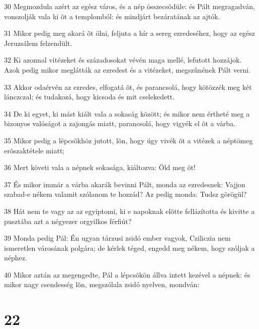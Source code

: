\par 30 Megmozdula azért az egész város, és a nép összecsõdüle: és Pált megragadván, vonszolják vala ki õt a templomból: és mindjárt bezáratának az ajtók.
\par 31 Mikor pedig meg akará õt ölni, feljuta a hír a sereg ezredeséhez, hogy az egész Jeruzsálem felzendült.
\par 32 Ki azonnal vitézeket és századosokat vévén maga mellé, lefutott hozzájok. Azok pedig mikor meglátták az ezredest és a vitézeket, megszûnének Pált verni.
\par 33 Akkor odaérvén az ezredes, elfogatá õt, és parancsolá, hogy kötözzék meg két lánczczal; és tudakozá, hogy kicsoda és mit cselekedett.
\par 34 De ki egyet, ki mást kiált vala a sokaság között; és mikor nem értheté meg a bizonyos valóságot a zajongás miatt, parancsolá, hogy vigyék el õt a várba.
\par 35 Mikor pedig a lépcsõkhöz jutott, lõn, hogy úgy vivék õt a vitézek a néptömeg erõszaktétele miatt;
\par 36 Mert követi vala a népnek sokasága, kiáltozva: Öld meg õt!
\par 37 És mikor immár a várba akarák bevinni Pált, monda az ezredesnek: Vajjon szabad-e nékem valamit szólanom te hozzád? Az pedig monda: Tudsz görögül?
\par 38 Hát nem te vagy az az egyiptomi, ki e napoknak elõtte fellázította és kivitte a pusztába azt a négyezer orgyilkos férfiút?
\par 39 Monda pedig Pál: Én ugyan tárzusi zsidó ember vagyok, Cziliczia nem ismeretlen városának polgára; de kérlek téged, engedd meg nékem, hogy szóljak a néphez.
\par 40 Mikor aztán az megengedte, Pál a lépcsõkön állva intett kezével a népnek: és mikor nagy csendesség lõn, megszólala zsidó nyelven, mondván:

\chapter{22}

